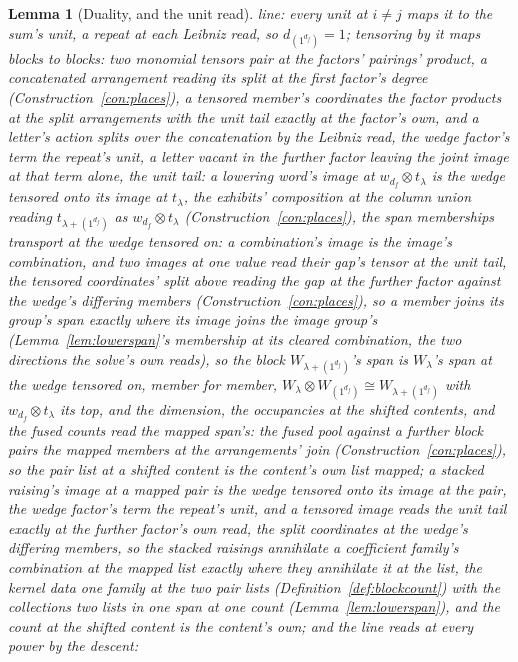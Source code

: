 \documentclass[11pt]{article}
\newtheorem{lemma}{Lemma}
\theoremstyle{definition}
\begin{document}
\begin{lemma}[Duality, and the unit read]
{line}: every unit at $i\ne j$
maps it to the sum's unit, a repeat at each Leibniz read, so
$d_{(1^{d_f})}=1$; tensoring by it maps blocks to blocks: two
monomial tensors pair at the factors' pairings' product, a
concatenated arrangement reading its split at the first factor's
degree (Construction~\ref{con:places}), a tensored member's
coordinates the factor products at the split arrangements with the
unit tail exactly at the factor's own, and a letter's action
splits over the concatenation by the Leibniz read, the wedge
factor's term the repeat's unit, a letter vacant in the further
factor leaving the joint image at that term alone, the unit tail:
a lowering word's image at $w_{d_f}\otimes t_\lambda$ is the
wedge tensored onto its image at $t_\lambda$, the exhibits'
composition at the column union reading $t_{\lambda+(1^{d_f})}$
as $w_{d_f}\otimes t_\lambda$
(Construction~\ref{con:places}), the span memberships transport
at the wedge tensored on: a combination's image is the image's
combination, and two images at one value read their gap's tensor
at the unit tail, the tensored coordinates' split above reading
the gap at the further factor against the wedge's differing
members (Construction~\ref{con:places}), so a member joins its
group's span exactly where its image joins the image group's
(Lemma~\ref{lem:lowerspan}'s membership at its cleared
combination, the two directions the solve's own reads), so the
block $W_{\lambda+(1^{d_f})}$'s span is $W_\lambda$'s span at the
wedge tensored on, member for member,
$W_\lambda\otimes W_{(1^{d_f})}\cong W_{\lambda+(1^{d_f})}$ with
$w_{d_f}\otimes t_\lambda$ its top, and the dimension, the
occupancies at the shifted contents, and the fused counts read the
mapped span's: the fused pool against a further block pairs the
mapped members at the arrangements' join
(Construction~\ref{con:places}), so the pair list at a shifted
content is the content's own list mapped; a stacked raising's
image at a mapped pair is the wedge tensored onto its image at
the pair, the wedge factor's term the repeat's unit, and a
tensored image reads the unit tail exactly at the further
factor's own read, the split coordinates at the wedge's differing
members, so the stacked raisings annihilate a coefficient
family's combination at the mapped list exactly where they
annihilate it at the list, the kernel data one family at the two
pair lists (Definition~\ref{def:blockcount}) with the collections
two lists in one span at one count (Lemma~\ref{lem:lowerspan}),
and the count at the shifted content is the content's
own; and the line reads at every power by the descent:

\end{lemma}
\end{document}
